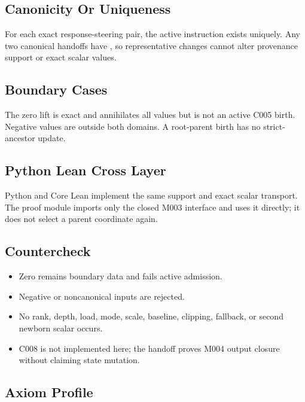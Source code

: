 \subsection{Canonicity Or Uniqueness}\label{canonicity-or-uniqueness-9}

For each exact response-steering pair, the active instruction exists
uniquely. Any two canonical handoffs have
\texttt{\protect{}}, so representative changes cannot
alter provenance support or exact scalar values.

\subsection{Boundary Cases}\label{boundary-cases-9}

The zero lift is exact and annihilates all values but is not an active
C005 birth. Negative values are outside both domains. A root-parent
birth has no strict-ancestor update.

\subsection{Python Lean Cross Layer}\label{python-lean-cross-layer-9}

Python and Core Lean implement the same support and exact scalar
transport. The proof module
\texttt{\protect{}} imports only the
closed M003 interface and uses it directly; it does not select a parent
coordinate again.

\subsection{Countercheck}\label{countercheck-9}

\begin{itemize}
\tightlist
\item
  Zero remains boundary data and fails active admission.
\item
  Negative or noncanonical inputs are rejected.
\item
  No rank, depth, load, mode, scale, baseline, clipping, fallback, or
  second newborn scalar occurs.
\item
  C008 is not implemented here; the handoff proves M004 output closure
  without claiming state mutation.
\end{itemize}

\subsection{Axiom Profile}\label{axiom-profile-10}


